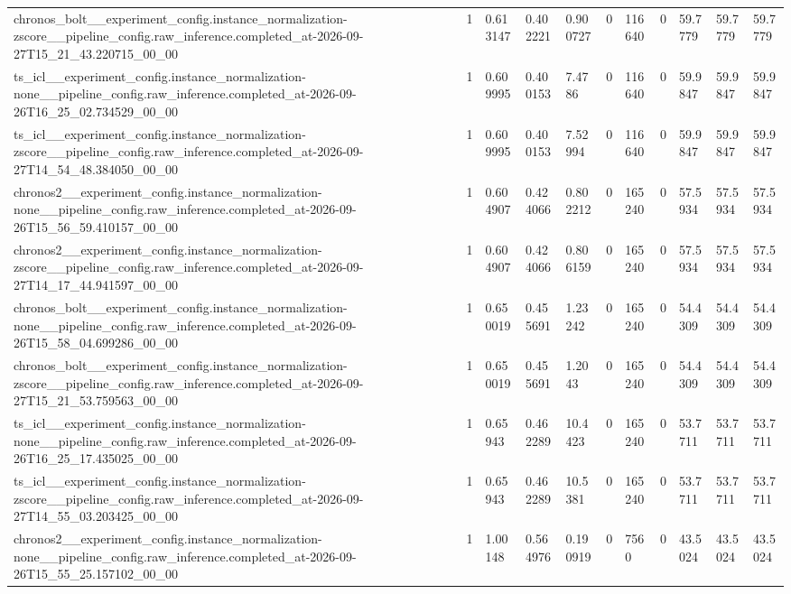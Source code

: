 \begin{tabular}{lllllllllll}
chronos\_bolt\_\_experiment\_config.instance\_normalization-zscore\_\_pipeline\_config.raw\_inference.completed\_at-2026-09-27T15\_21\_43.220715\_00\_00 & 1 & 0.613147 & 0.402221 & 0.900727 & 0 & 116640 & 0 & 59.7779 & 59.7779 & 59.7779 \\
ts\_icl\_\_experiment\_config.instance\_normalization-none\_\_pipeline\_config.raw\_inference.completed\_at-2026-09-26T16\_25\_02.734529\_00\_00 & 1 & 0.609995 & 0.400153 & 7.4786 & 0 & 116640 & 0 & 59.9847 & 59.9847 & 59.9847 \\
ts\_icl\_\_experiment\_config.instance\_normalization-zscore\_\_pipeline\_config.raw\_inference.completed\_at-2026-09-27T14\_54\_48.384050\_00\_00 & 1 & 0.609995 & 0.400153 & 7.52994 & 0 & 116640 & 0 & 59.9847 & 59.9847 & 59.9847 \\
chronos2\_\_experiment\_config.instance\_normalization-none\_\_pipeline\_config.raw\_inference.completed\_at-2026-09-26T15\_56\_59.410157\_00\_00 & 1 & 0.604907 & 0.424066 & 0.802212 & 0 & 165240 & 0 & 57.5934 & 57.5934 & 57.5934 \\
chronos2\_\_experiment\_config.instance\_normalization-zscore\_\_pipeline\_config.raw\_inference.completed\_at-2026-09-27T14\_17\_44.941597\_00\_00 & 1 & 0.604907 & 0.424066 & 0.806159 & 0 & 165240 & 0 & 57.5934 & 57.5934 & 57.5934 \\
chronos\_bolt\_\_experiment\_config.instance\_normalization-none\_\_pipeline\_config.raw\_inference.completed\_at-2026-09-26T15\_58\_04.699286\_00\_00 & 1 & 0.650019 & 0.455691 & 1.23242 & 0 & 165240 & 0 & 54.4309 & 54.4309 & 54.4309 \\
chronos\_bolt\_\_experiment\_config.instance\_normalization-zscore\_\_pipeline\_config.raw\_inference.completed\_at-2026-09-27T15\_21\_53.759563\_00\_00 & 1 & 0.650019 & 0.455691 & 1.2043 & 0 & 165240 & 0 & 54.4309 & 54.4309 & 54.4309 \\
ts\_icl\_\_experiment\_config.instance\_normalization-none\_\_pipeline\_config.raw\_inference.completed\_at-2026-09-26T16\_25\_17.435025\_00\_00 & 1 & 0.65943 & 0.462289 & 10.4423 & 0 & 165240 & 0 & 53.7711 & 53.7711 & 53.7711 \\
ts\_icl\_\_experiment\_config.instance\_normalization-zscore\_\_pipeline\_config.raw\_inference.completed\_at-2026-09-27T14\_55\_03.203425\_00\_00 & 1 & 0.65943 & 0.462289 & 10.5381 & 0 & 165240 & 0 & 53.7711 & 53.7711 & 53.7711 \\
chronos2\_\_experiment\_config.instance\_normalization-none\_\_pipeline\_config.raw\_inference.completed\_at-2026-09-26T15\_55\_25.157102\_00\_00 & 1 & 1.00148 & 0.564976 & 0.190919 & 0 & 7560 & 0 & 43.5024 & 43.5024 & 43.5024 \\

\end{tabular}
